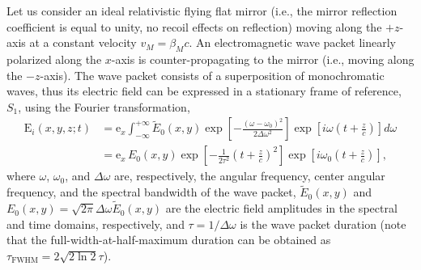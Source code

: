 \documentclass[10pt, a4paper, twoside, openright]{report}
\renewcommand{\vec}[1]{\boldsymbol{\mathrm{#1}}}
\begin{document}
Let us consider an ideal relativistic flying flat mirror (i.e., the mirror reflection coefficient is equal to unity, no recoil effects on reflection) moving along the $ +z $-axis at a constant velocity $ v_M = \beta_M c $. An electromagnetic wave packet linearly polarized along the $ x $-axis is counter-propagating to the mirror (i.e., moving along the $ -z $-axis). The wave packet consists of a superposition of monochromatic waves, thus its electric field can be expressed in a stationary frame of reference, $ S_1 $, using the Fourier transformation,
\begin{equation}\label{eq:incident_lab_frame_1}
\begin{split}
\vec{E}_i \left(x, y, z; t \right) &= \vec{e}_x \int_{-\infty}^{+\infty} \tilde{E}_0 \left(x, y \right) \exp \left[ -\frac{\left( \omega - \omega_0 \right)^2}{2 \Delta \omega^2} \right] \exp \left[ i \omega \left(t + \frac{z}{c}\right) \right] d \omega \\
&= \vec{e}_x \, E_0 \left(x, y \right) \exp \left[ - \frac{1}{2 \tau^2} \left(t + \frac{z}{c}\right)^2 \right] \exp \left[ i \omega_0 \left(t + \frac{z}{c}\right) \right],
\end{split}
\end{equation}
where $ \omega $, $ \omega_0 $, and $ \Delta \omega $ are, respectively, the angular frequency, center angular frequency, and the spectral bandwidth of the wave packet, $ \tilde{E}_0 \left(x, y \right) $ and $ E_0 \left(x, y \right) = \sqrt{2 \pi} \Delta \omega \tilde{E}_0 \left(x, y \right) $ are the electric field amplitudes in the spectral and time domains, respectively, and $ \tau = 1 / \Delta \omega $ is the wave packet duration (note that the full-width-at-half-maximum duration can be obtained as $ \tau_{\mathrm{FWHM}} = 2 \sqrt{2 \ln 2} \tau $).

\end{document}
